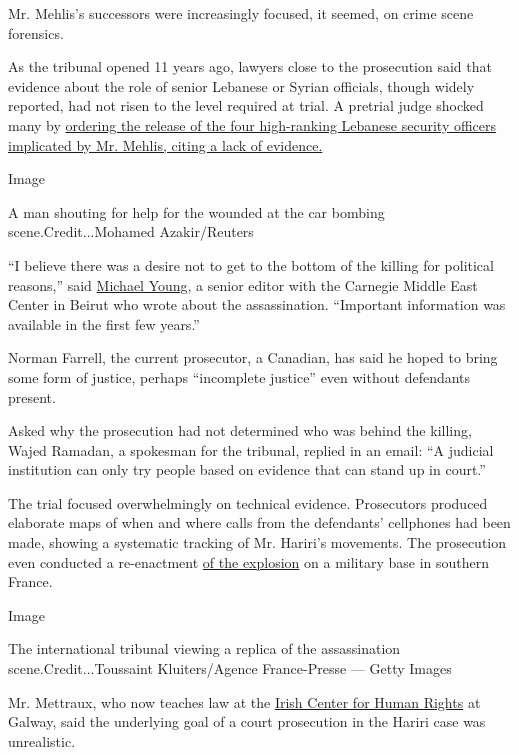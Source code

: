Mr. Mehlis's successors were increasingly focused, it seemed, on crime
scene forensics.

As the tribunal opened 11 years ago, lawyers close to the prosecution
said that evidence about the role of senior Lebanese or Syrian
officials, though widely reported, had not risen to the level required
at trial. A pretrial judge shocked many by
\href{https://www.nytimes.com/2009/04/30/world/middleeast/30lebanon.html?searchResultPosition=5}{ordering
the release of the four high-ranking Lebanese security officers
implicated by Mr. Mehlis, citing a lack of evidence.}

Image

A man shouting for help for the wounded at the car bombing
scene.Credit...Mohamed Azakir/Reuters

``I believe there was a desire not to get to the bottom of the killing
for political reasons,'' said
\href{https://carnegie-mec.org/experts/1258}{Michael Young}, a senior
editor with the Carnegie Middle East Center in Beirut who wrote about
the assassination. ``Important information was available in the first
few years.''

Norman Farrell, the current prosecutor, a Canadian, has said he hoped to
bring some form of justice, perhaps ``incomplete justice'' even without
defendants present.

Asked why the prosecution had not determined who was behind the killing,
Wajed Ramadan, a spokesman for the tribunal, replied in an email: ``A
judicial institution can only try people based on evidence that can
stand up in court.''

The trial focused overwhelmingly on technical evidence. Prosecutors
produced elaborate maps of when and where calls from the defendants'
cellphones had been made, showing a systematic tracking of Mr. Hariri's
movements. The prosecution even conducted a re-enactment
\href{https://www.france24.com/en/20101020-hariri-murder-blast-reconstructed-france-court-labanon-assasination}{of
the explosion} on a military base in southern France.

Image

The international tribunal viewing a replica of the assassination
scene.Credit...Toussaint Kluiters/Agence France-Presse --- Getty Images

Mr. Mettraux, who now teaches law at the
\href{http://www.nuigalway.ie/irish-centre-human-rights/}{Irish Center
for Human Rights} at Galway, said the underlying goal of a court
prosecution in the Hariri case was unrealistic.

